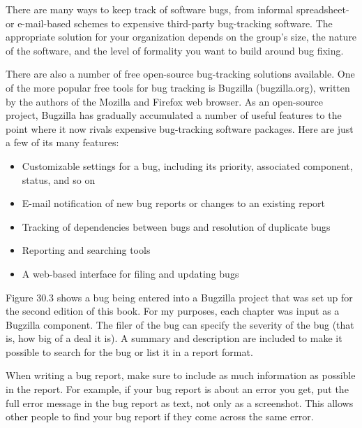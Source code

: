 

There are many ways to keep track of software bugs, from informal spreadsheet- or e-mail-based schemes to expensive third-party bug-tracking software. The appropriate solution for your organization depends on the group’s size, the nature of the software, and the level of formality you want to build around bug fixing.

There are also a number of free open-source bug-tracking solutions available. One of the more popular free tools for bug tracking is Bugzilla (bugzilla.org), written by the authors of the Mozilla and Firefox web browser. As an open-source project, Bugzilla has gradually accumulated a number of useful features to the point where it now rivals expensive bug-tracking software packages. Here are just a few of its many features:

\begin{itemize}
\item
Customizable settings for a bug, including its priority, associated component, status, and so on

\item
E-mail notification of new bug reports or changes to an existing report

\item
Tracking of dependencies between bugs and resolution of duplicate bugs

\item
Reporting and searching tools

\item
A web-based interface for filing and updating bugs
\end{itemize}

Figure 30.3 shows a bug being entered into a Bugzilla project that was set up for the second edition of this book. For my purposes, each chapter was input as a Bugzilla component. The filer of the bug can specify the severity of the bug (that is, how big of a deal it is). A summary and description are included to make it possible to search for the bug or list it in a report format.


When writing a bug report, make sure to include as much information as possible in the report. For example, if your bug report is about an error you get, put the full error message in the bug report as text, not only as a screenshot. This allows other people to find your bug report if they come across the same error.

